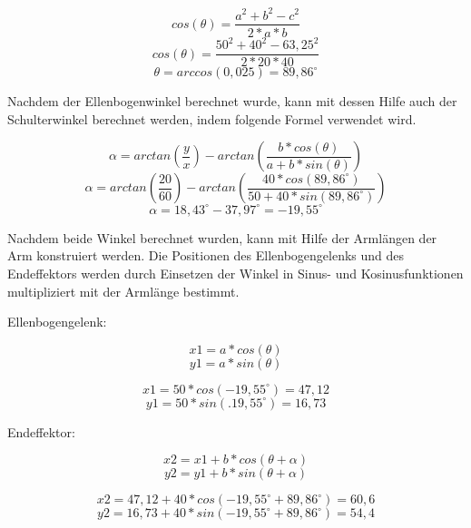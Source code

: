 \documentclass[12pt]{article}
\begin{document}
                    \[
                        cos(\theta)= \frac{a^2+b^2-c^2}{2*a*b}
                    \]
                    \[
                        cos(\theta)= \frac{50^2+40^2-63,25^2}{2*20*40}
                    \]
                    \[
                        \theta= arccos(0,025) = 89,86^\circ
                    \]

                    Nachdem der Ellenbogenwinkel berechnet wurde, kann mit dessen Hilfe auch der Schulterwinkel
                    berechnet werden, indem folgende Formel verwendet wird.

                    \[
                        \alpha = arctan(\frac{y}{x}) - arctan(\frac{b*cos(\theta)}{a+b*sin(\theta)})
                    \]
                    \[
                        \alpha = arctan(\frac{20}{60}) - arctan(\frac{40*cos(89,86^\circ)}{50+40*sin(89,86^\circ)})                    \]
                    \[
                        \alpha = 18,43^\circ - 37,97^\circ = -19,55^\circ
                    \]

                    Nachdem beide Winkel berechnet wurden, kann mit Hilfe der Armlängen der Arm konstruiert werden.
                    Die Positionen des Ellenbogengelenks und des Endeffektors werden durch Einsetzen der Winkel in
                    Sinus- und Kosinusfunktionen multipliziert mit der Armlänge bestimmt.

                    Ellenbogengelenk:

                    \[
                        x1 = a * cos(\theta)
                    \]
                    \[
                        y1 = a * sin(\theta)
                    \]

                    \[
                        x1 = 50 * cos(-19,55^\circ) = 47,12
                    \]
                    \[
                        y1 = 50 * sin(.19,55^\circ) = 16,73
                    \]

                    Endeffektor:

                    \[
                        x2 = x1 + b * cos(\theta + \alpha)
                    \]
                    \[
                        y2 = y1 + b * sin(\theta + \alpha)
                    \]

                    \[
                        x2 = 47,12 + 40 * cos(-19,55^\circ + 89,86^\circ) = 60,6
                    \]
                    \[
                        y2 = 16,73 + 40 * sin(-19,55^\circ + 89,86^\circ) = 54,4
                    \]
\end{document}
